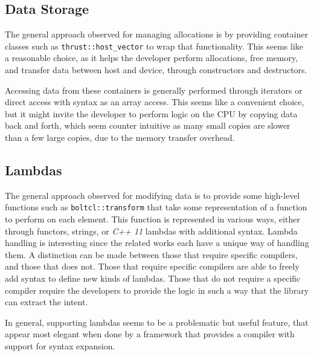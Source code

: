 \subsection{Data Storage}
The general approach observed for managing allocations is by providing container classes such as \texttt{thrust::host\_vector} to wrap that functionality. This seems like a reasonable choice, as it helps the developer perform allocations, free memory, and transfer data between host and device, through constructors and destructors.

Accessing data from these containers is generally performed through iterators or direct access with syntax as an array access. This seems like a convenient choice, but it might invite the developer to perform logic on the CPU by copying data back and forth, which seem counter intuitive as many small copies are slower than a few large copies, due to the memory transfer overhead\cite{memoryTransferOverhead}.

\subsection{Lambdas}
The general approach observed for modifying data is to provide some high-level functions such as \texttt{boltcl::transform} that take some representation of a function to perform on each element. This function is represented in various ways, either through functors, strings, or \textit{C++ 11} lambdas with additional syntax. Lambda handling is interesting since the related works each have a unique way of handling them. A distinction can be made between those that require specific compilers, and those that does not. Those that require specific compilers are able to freely add syntax to define new kinds of lambdas. Those that do not require a specific compiler require the developers to provide the logic in such a way that the library can extract the intent.

In general, supporting lambdas seems to be a problematic but useful feature, that appear most elegant when done by a framework that provides a compiler with support for syntax expansion.